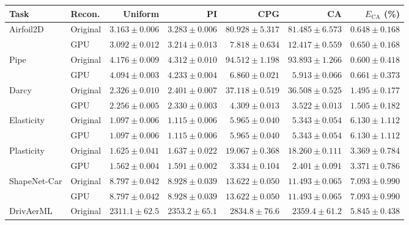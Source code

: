 \begin{table}[!ht]
\centering
\begingroup
\footnotesize
\setlength{\tabcolsep}{3.0pt}
\renewcommand{\arraystretch}{1.08}
\begin{tabular}{llrrrrr}
\toprule
Task & Recon. & Uniform & PI & CPG & CA & $E_{\mathrm{CA}}$ (\%) \\
\midrule
Airfoil2D & Original & $3.163\!\pm\!0.006$ & $3.283\!\pm\!0.006$ & $80.928\!\pm\!5.317$ & $81.485\!\pm\!6.573$ & $0.648\!\pm\!0.168$ \\
 & GPU & $3.092\!\pm\!0.012$ & $3.214\!\pm\!0.013$ & $7.818\!\pm\!0.634$ & $12.417\!\pm\!0.559$ & $0.650\!\pm\!0.168$ \\
\addlinespace[2pt]
Pipe & Original & $4.176\!\pm\!0.009$ & $4.312\!\pm\!0.010$ & $94.512\!\pm\!1.198$ & $93.893\!\pm\!1.266$ & $0.600\!\pm\!0.418$ \\
 & GPU & $4.094\!\pm\!0.003$ & $4.233\!\pm\!0.004$ & $6.860\!\pm\!0.021$ & $5.913\!\pm\!0.066$ & $0.661\!\pm\!0.373$ \\
\addlinespace[2pt]
Darcy & Original & $2.326\!\pm\!0.010$ & $2.401\!\pm\!0.007$ & $37.118\!\pm\!0.519$ & $36.508\!\pm\!0.525$ & $1.495\!\pm\!0.177$ \\
 & GPU & $2.256\!\pm\!0.005$ & $2.330\!\pm\!0.003$ & $4.309\!\pm\!0.013$ & $3.522\!\pm\!0.013$ & $1.505\!\pm\!0.182$ \\
\addlinespace[2pt]
Elasticity & Original & $1.097\!\pm\!0.006$ & $1.115\!\pm\!0.006$ & $5.965\!\pm\!0.040$ & $5.343\!\pm\!0.054$ & $6.130\!\pm\!1.112$ \\
 & GPU & $1.097\!\pm\!0.006$ & $1.115\!\pm\!0.006$ & $5.965\!\pm\!0.040$ & $5.343\!\pm\!0.054$ & $6.130\!\pm\!1.112$ \\
\addlinespace[2pt]
Plasticity & Original & $1.625\!\pm\!0.041$ & $1.637\!\pm\!0.022$ & $19.067\!\pm\!0.368$ & $18.260\!\pm\!0.111$ & $3.369\!\pm\!0.784$ \\
 & GPU & $1.562\!\pm\!0.004$ & $1.591\!\pm\!0.002$ & $3.334\!\pm\!0.104$ & $2.401\!\pm\!0.091$ & $3.371\!\pm\!0.786$ \\
\addlinespace[2pt]
ShapeNet-Car & Original & $8.797\!\pm\!0.042$ & $8.928\!\pm\!0.039$ & $13.622\!\pm\!0.050$ & $11.493\!\pm\!0.065$ & $7.093\!\pm\!0.990$ \\
 & GPU & $8.797\!\pm\!0.042$ & $8.928\!\pm\!0.039$ & $13.622\!\pm\!0.050$ & $11.493\!\pm\!0.065$ & $7.093\!\pm\!0.990$ \\
\addlinespace[2pt]
DrivAerML & Original & $2311.1\!\pm\!62.5$ & $2353.2\!\pm\!65.1$ & $2834.8\!\pm\!76.6$ & $2359.4\!\pm\!61.2$ & $5.845\!\pm\!0.438$ \\

\end{tabular}
\end{table}
